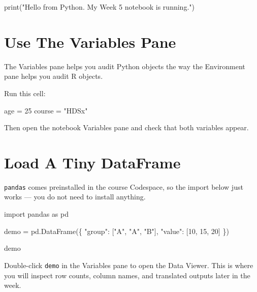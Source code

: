 \documentclass[
  letterpaper,
  DIV=11,
  numbers=noendperiod,
  oneside]{scrreprt}
\newenvironment{Shaded}{\begin{snugshade}}{\end{snugshade}}
\newcommand{\BuiltInTok}[1]{\textcolor[rgb]{0.00,0.23,0.31}{#1}}
\newcommand{\DecValTok}[1]{\textcolor[rgb]{0.68,0.00,0.00}{#1}}
\newcommand{\ImportTok}[1]{\textcolor[rgb]{0.00,0.46,0.62}{#1}}
\newcommand{\NormalTok}[1]{\textcolor[rgb]{0.00,0.23,0.31}{#1}}
\newcommand{\OperatorTok}[1]{\textcolor[rgb]{0.37,0.37,0.37}{#1}}
\newcommand{\StringTok}[1]{\textcolor[rgb]{0.13,0.47,0.30}{#1}}
\begin{document}
\begin{Shaded}
\begin{Highlighting}[numbers=left,,]
\BuiltInTok{print}\NormalTok{(}\StringTok{"Hello from Python. My Week 5 notebook is running."}\NormalTok{)}
\end{Highlighting}
\end{Shaded}

\section{Use The Variables Pane}\label{use-the-variables-pane}

The Variables pane helps you audit Python objects the way the
Environment pane helps you audit R objects.

Run this cell:

\begin{Shaded}
\begin{Highlighting}[numbers=left,,]
\NormalTok{age }\OperatorTok{=} \DecValTok{25}
\NormalTok{course }\OperatorTok{=} \StringTok{"HDSx"}
\end{Highlighting}
\end{Shaded}

Then open the notebook Variables pane and check that both variables
appear.

\section{Load A Tiny DataFrame}\label{load-a-tiny-dataframe}

\texttt{pandas} comes preinstalled in the course Codespace, so the
import below just works --- you do not need to install anything.

\begin{Shaded}
\begin{Highlighting}[numbers=left,,]
\ImportTok{import}\NormalTok{ pandas }\ImportTok{as}\NormalTok{ pd}

\NormalTok{demo }\OperatorTok{=}\NormalTok{ pd.DataFrame(\{}
    \StringTok{"group"}\NormalTok{: [}\StringTok{"A"}\NormalTok{, }\StringTok{"A"}\NormalTok{, }\StringTok{"B"}\NormalTok{],}
    \StringTok{"value"}\NormalTok{: [}\DecValTok{10}\NormalTok{, }\DecValTok{15}\NormalTok{, }\DecValTok{20}\NormalTok{]}
\NormalTok{\})}

\NormalTok{demo}
\end{Highlighting}
\end{Shaded}

Double-click \texttt{demo} in the Variables pane to open the Data
Viewer. This is where you will inspect row counts, column names, and
translated outputs later in the week.
\end{document}

